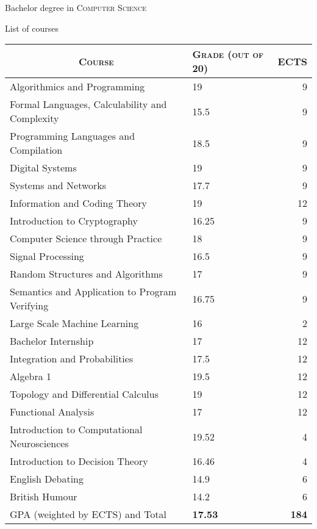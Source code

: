 \documentclass[a4paper,10pt]{article} %
\begin{document}

  \vspace{2cm}


\par{\centering\Large \hypertarget{notes}{Bachelor degree in \textsc{Computer
      Science}}\par}\large{\centering List of courses\par}\normalsize

\begin{center}
\begin{tabular}{llr}
  \multicolumn{1}{c}{\textsc{Course}} & \textsc{Grade (out of 20)}&\textsc{ECTS}\\ \hline
  Algorithmics and Programming & 19 & 9 \\
  Formal Languages, Calculability and Complexity & 15.5 & 9 \\
  Programming Languages and Compilation & 18.5 & 9 \\
  Digital Systems & 19 & 9 \\
  Systems and Networks & 17.7 & 9 \\
  Information and Coding Theory & 19 & 12 \\
  Introduction to Cryptography & 16.25 & 9 \\
  Computer Science through Practice & 18 & 9 \\
  Signal Processing & 16.5 & 9 \\
  Random Structures and Algorithms & 17 & 9 \\
  Semantics and Application to Program Verifying & 16.75 & 9 \\
  Large Scale Machine Learning & 16 & 2 \\
  Bachelor Internship & 17 & 12 \\
  \hline
  Integration and Probabilities & 17.5 & 12 \\
  Algebra 1 & 19.5 & 12 \\
  Topology and Differential Calculus & 19 & 12 \\
  Functional Analysis & 17 & 12 \\
  \hline
  Introduction to Computational Neurosciences & 19.52 & 4 \\
  Introduction to Decision Theory & 16.46 & 4 \\
  \hline
  English Debating & 14.9 & 6 \\
  British Humour & 14.2 & 6 \\
  \hline
  \textsc{GPA} (weighted by \textsc{ECTS}) and Total & \textbf{17.53} & \textbf{184}
\end{tabular}
\end{center}

\end{document}
